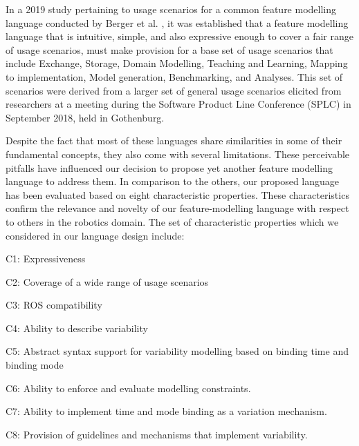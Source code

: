 \documentclass[conference]{IEEEtran}
\begin{document}
In a 2019 study pertaining to usage scenarios for a common feature modelling language conducted by Berger et al. \cite{fmod-lang-scenarios}, it was established that a feature modelling language that is intuitive, simple, and also expressive enough to cover a fair range of usage scenarios, must make provision for a base set of usage scenarios that include Exchange, Storage, Domain Modelling, Teaching and Learning, Mapping to implementation, Model generation, Benchmarking, and Analyses. This set of scenarios were derived from a larger set of general usage scenarios elicited from researchers at a meeting during the Software Product Line Conference (SPLC) in September 2018, held in Gothenburg.

Despite the fact that most of these languages share similarities in some of their fundamental concepts, they also come with several limitations. These perceivable pitfalls have influenced our decision to propose yet another feature modelling language to address them. In comparison to the others, our proposed language has been evaluated based on eight characteristic properties. These characteristics confirm the relevance and novelty of our feature-modelling language with respect to others in the robotics domain. The set of characteristic properties which we considered in our language design include:
\begin{enumerate*}[label=(\roman*)]
	\item C1: Expressiveness
	\item C2: Coverage of a wide range of usage scenarios
	\item C3: ROS compatibility
	\item C4: Ability to describe variability
	\item C5: Abstract syntax support for variability modelling based on binding time and binding mode
	\item C6: Ability to enforce and evaluate modelling constraints.
	\item C7: Ability to implement time and mode binding as a variation mechanism.
	\item C8: Provision of guidelines and mechanisms that implement variability.
\end{enumerate*}
\end{document}
